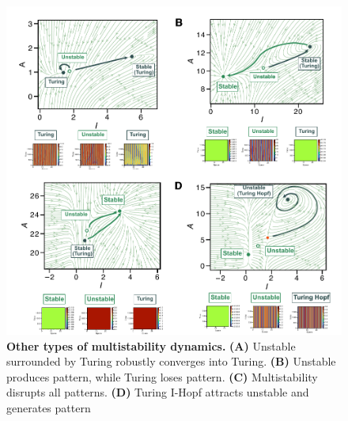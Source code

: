 \begin{figure}[!h]
    \includegraphics[width=1\textwidth]{figures/multistability_leftovers}

    \caption{\textbf{Other types of multistability dynamics.} \textbf{(A)} Unstable surrounded by Turing robustly converges into Turing. \textbf{(B)} Unstable produces pattern, while Turing loses pattern. \textbf{(C)} Multistability disrupts all patterns. \textbf{(D)} Turing I-Hopf attracts unstable and generates pattern}

    \label{sup_fig4}
\end{figure}

